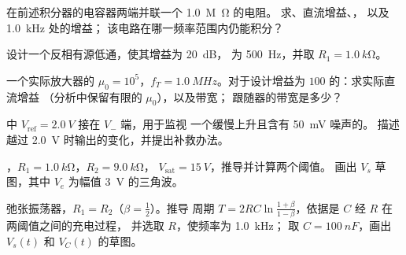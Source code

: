\begin{exercise}[$\star\star$]\label{exo:b1:operational-amplifier:7}
在前述积分器的电容器两端并联一个 \qty{1.0}{M\ohm} 的电阻。
求、直流增益、，
以及 \qty{1.0}{kHz} 处的增益；
该电路在哪一频率范围内仍能积分？
\end{exercise}

\begin{exercise}[$\star\star$]\label{exo:b1:operational-amplifier:8}
设计一个反相有源低通，使其增益为 \qty{20}{dB}，
为 \qty{500}{Hz}，并取 $R_1 = \qty{1.0}{k\ohm}$。
\end{exercise}

\begin{exercise}[$\star\star$]\label{exo:b1:operational-amplifier:9}
一个实际放大器的 $\mu_0 = 10^5$，$f_T = \qty{1.0}{MHz}$。对于设计增益为
$100$ 的：求实际直流增益
（分析中保留有限的 $\mu_0$），以及带宽；
跟随器的带宽是多少？
\end{exercise}

\begin{exercise}[$\star\star\star$]\label{exo:b1:operational-amplifier:10}
中 $V_{\mathrm{ref}} = \qty{2.0}{V}$ 接在 $V_-$ 端，用于监视
一个缓慢上升且含有 \qty{50}{mV} 噪声的。
描述越过 \qty{2.0}{V} 时输出的变化，并提出补救办法。
\end{exercise}

\begin{exercise}[$\star\star\star$]\label{exo:b1:operational-amplifier:11}
，$R_1 = \qty{1.0}{k\ohm}$，$R_2 = \qty{9.0}{k\ohm}$，
$V_{\mathrm{sat}} = \qty{15}{V}$，推导并计算两个阈值。
画出 $V_s$ 草图，其中 $V_e$ 为幅值 \qty{3}{V} 的三角波。
\end{exercise}

\begin{exercise}[$\star\star\star$]\label{exo:b1:operational-amplifier:12}
弛张振荡器，$R_1 = R_2$（$\beta = \tfrac12$）。推导
周期 $T = 2RC\ln\frac{1 + \beta}{1 - \beta}$，依据是 $C$ 经 $R$ 在两阈值之间的充电过程，
并选取 $R$，使频率为 \qty{1.0}{kHz}；
取 $C = \qty{100}{nF}$，画出 $V_s(t)$ 和 $V_C(t)$ 的草图。
\end{exercise}

